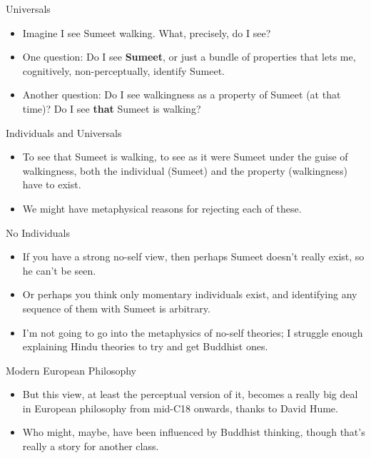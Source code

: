 \documentclass[
  17pt,
  letterpaper,
  ignorenonframetext,
  aspectratio=169,
  handout]{beamer}
\providecommand{\tightlist}{%
  \setlength{\itemsep}{0pt}\setlength{\parskip}{0pt}}\usepackage{longtable,booktabs,array}
\begin{document}
\begin{frame}{Universals}
\protect\hypertarget{universals}{}
\begin{itemize}[<+->]
\tightlist
\item
  Imagine I see Sumeet walking. What, precisely, do I see?
\item
  One question: Do I see \textbf{Sumeet}, or just a bundle of properties
  that lets me, cognitively, non-perceptually, identify Sumeet.
\item
  Another question: Do I see walkingness as a property of Sumeet (at
  that time)? Do I see \textbf{that} Sumeet is walking?
\end{itemize}
\end{frame}

\begin{frame}{Individuals and Universals}
\protect\hypertarget{individuals-and-universals}{}
\begin{itemize}[<+->]
\tightlist
\item
  To see that Sumeet is walking, to see as it were Sumeet under the
  guise of walkingness, both the individual (Sumeet) and the property
  (walkingness) have to exist.
\item
  We might have metaphysical reasons for rejecting each of these.
\end{itemize}
\end{frame}

\begin{frame}{No Individuals}
\protect\hypertarget{no-individuals}{}
\begin{itemize}[<+->]
\tightlist
\item
  If you have a strong no-self view, then perhaps Sumeet doesn't really
  exist, so he can't be seen.
\item
  Or perhaps you think only momentary individuals exist, and identifying
  any sequence of them with Sumeet is arbitrary.
\item
  I'm not going to go into the metaphysics of no-self theories; I
  struggle enough explaining Hindu theories to try and get Buddhist
  ones.
\end{itemize}
\end{frame}

\begin{frame}{Modern European Philosophy}
\protect\hypertarget{modern-european-philosophy}{}
\begin{itemize}[<+->]
\tightlist
\item
  But this view, at least the perceptual version of it, becomes a really
  big deal in European philosophy from mid-C18 onwards, thanks to David
  Hume.
\item
  Who might, maybe, have been influenced by Buddhist thinking, though
  that's really a story for another class.
\end{itemize}
\end{frame}
\end{document}
